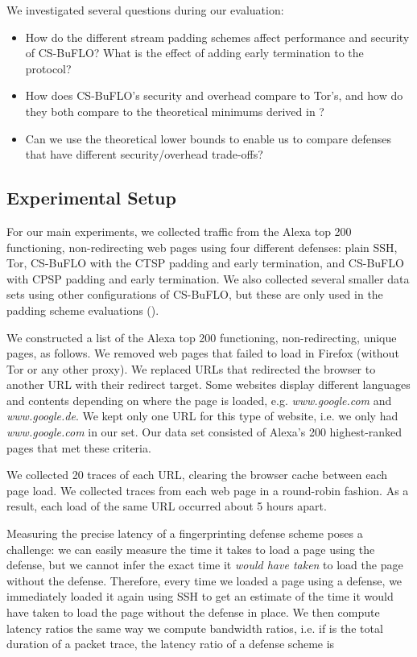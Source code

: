 \documentclass[10pt,journal]{IEEEtran}
\newcommand{\csb} {CS-BuFLO\xspace}
\begin{document}
We investigated several questions during our evaluation:
\begin{itemize}
\item How do the different stream padding schemes affect performance
    and security of \csb?  What is the effect of adding early
    termination to the protocol?
  \item How does \csb's security and overhead compare to Tor's, and
    how do they both compare to the theoretical minimums derived in
    ?  
  \item Can we use the theoretical lower bounds to enable us to
    compare defenses that have different security/overhead trade-offs?
\end{itemize}

\subsection{Experimental Setup}
\label{subsec:setup}


For our main experiments, we collected traffic from the Alexa top 200
functioning, non-redirecting web pages using four different defenses:
plain SSH, Tor, \csb with the CTSP padding and early termination, and
\csb with CPSP padding and early termination.  We also collected
several smaller data sets using other configurations of \csb, but
these are only used in the padding scheme evaluations
().

We constructed a list of the Alexa top 200 functioning,
non-redirecting, unique pages, as follows.  We removed web pages that
failed to load in Firefox (without Tor or any other proxy).  We
replaced URLs that redirected the browser to another URL with their
redirect target.  Some websites display different languages and
contents depending on where the page is loaded,
e.g. \textit{www.google.com} and \textit{www.google.de}. We kept only
one URL for this type of website, i.e. we only had
\textit{www.google.com} in our set.  Our data set consisted of Alexa's
200 highest-ranked pages that met these criteria.

We collected 20 traces of each URL, clearing the browser cache
between each page load. We collected traces from each web page in a
round-robin fashion.  As a result, each load of the same URL occurred
about 5 hours apart.

Measuring the precise latency of a fingerprinting defense scheme poses a
challenge: we can easily measure the time it takes to load a page
using the defense, but we cannot infer the exact time it \emph{would have
taken} to load the page without the defense.  Therefore, every time we 
loaded a page using a defense, we immediately loaded it again using SSH 
to get an estimate of the time it would have taken to load the page without
the defense in place.  We then compute latency ratios the same way
we compute bandwidth ratios, i.e. if  is the total duration
of a packet trace, the latency ratio of a defense scheme is
\end{document}
